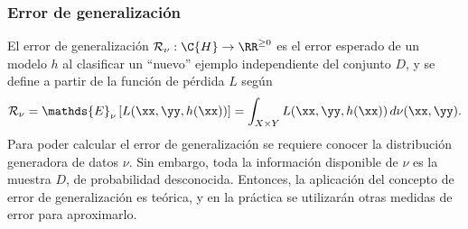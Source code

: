 %
\subsubsection{Error de generalización}
%
El error de generalización
$\mathcal{R}_\nu:\C{H}\rightarrow\RR^{\geq0}$ es el error esperado de
un modelo $h$ al clasificar un ``nuevo'' ejemplo independiente
del conjunto $D$, y se define a partir de la función de pérdida $L$ según
%
\begin{align}
  \mathcal{R}_\nu=\mathds{E}_\nu\left[L(\xx,\yy,h(\xx))\right]
  =\int_{X\times Y} L(\xx,\yy,h(\xx))\, d\nu(\xx,\yy).
\end{align}
%
Para poder calcular el error de generalización se requiere conocer la
distribución generadora de datos $\nu$.
Sin embargo, toda la información disponible de $\nu$ es la muestra $D$,
de probabilidad desconocida.
Entonces, la aplicación del concepto de error de generalización es
teórica, y en la práctica se utilizarán otras medidas de error para
aproximarlo.

